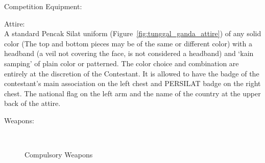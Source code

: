 \begin{legal}
\item Competition Equipment:


    \begin{legal}
    \item Attire: \\

    A standard Pencak Silat uniform (Figure~\ref{fig:tunggal_ganda_attire}) of any solid color (The top and bottom pieces may be of the same or different color) with a headband (a veil not covering the face, is not considered a headband) and `kain samping' of plain color or patterned. The color choice and combination are entirely at the discretion of the Contestant. It is allowed to have the badge of the contestant’s main association on the left chest and PERSILAT badge on the right chest. The national flag on the left arm and the name of the country at the upper back of the attire.

    \item Weapons:

        \begin{figure}[ht!]
        \centering
        ~
        \caption{Compulsory Weapons}
        \end{figure}


\end{legal}
\end{legal}
